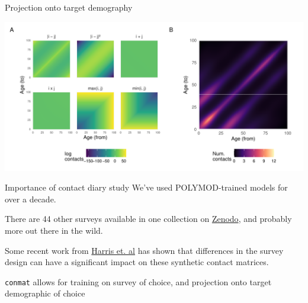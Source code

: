 \documentclass[
  14pt,
  ignorenonframetext,
  aspectratio=169,
]{beamer}
\begin{document}
\begin{frame}{Projection onto target demography}
\label{projection-onto-target-demography}
\begin{center}
\includegraphics{index_files/figure-beamer/partial-plots-create-1.pdf}
\end{center}
\end{frame}

\begin{frame}[fragile]{Importance of contact diary study}
\label{importance-of-contact-diary-study}
We've used POLYMOD-trained models for over a decade.

There are 44 other surveys available in one collection on
\href{https://zenodo.org/communities/social_contact_data/records}{Zenodo},
and probably more out there in the wild.

Some recent work from \href{https://arxiv.org/abs/2406.01639}{Harris et.
al} has shown that differences in the survey design can have a
significant impact on these synthetic contact matrices.

\begin{tcolorbox}[enhanced jigsaw, title=\textcolor{quarto-callout-tip-color}{\faLightbulb}\hspace{0.5em}{Tip}, opacityback=0, opacitybacktitle=0.6, colbacktitle=quarto-callout-tip-color!10!white, bottomrule=.15mm, toprule=.15mm, toptitle=1mm, arc=.35mm, titlerule=0mm, colframe=quarto-callout-tip-color-frame, rightrule=.15mm, bottomtitle=1mm, leftrule=.75mm, coltitle=black, left=2mm, colback=white, breakable]

\texttt{conmat} allows for training on survey of choice, and projection
onto target demographic of choice

\end{tcolorbox}
\end{frame}
\end{document}
